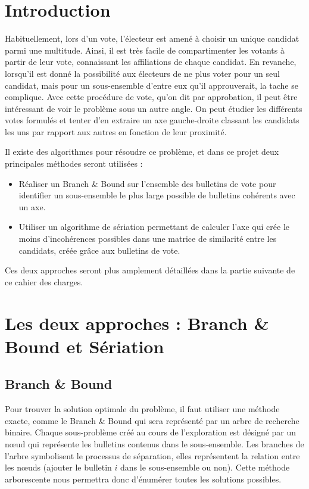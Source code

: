 \documentclass[12pt]{article}
\begin{document}
\section*{Introduction}
Habituellement, lors d'un vote, l'\'{e}lecteur est amen\'{e} \`{a} choisir un unique candidat parmi une multitude. Ainsi, il est tr\`{e}s facile de compartimenter les votants \`{a} partir de leur vote, connaissant les affiliations de chaque candidat. En revanche, lorsqu'il est donn\'{e} la possibilit\'{e} aux \'{e}lecteurs de ne plus voter pour un seul candidat, mais pour un sous-ensemble d'entre eux qu'il approuverait, la tache se complique. Avec cette proc\'{e}dure de vote, qu'on dit par approbation, il peut \^{e}tre int\'{e}ressant de voir le probl\`{e}me sous un autre angle. On peut \'{e}tudier les diff\'{e}rents votes formul\'{e}s et tenter d'en extraire un axe \og gauche-droite \fg{} classant les candidats les uns par rapport aux autres en fonction de leur proximit\'{e}.

Il existe des algorithmes pour r\'{e}soudre ce probl\`{e}me, et dans ce projet deux principales m\'{e}thodes seront utilis\'{e}es :
\begin{itemize}
	\item R\'{e}aliser un \og Branch \& Bound \fg{} sur l'ensemble des bulletins de vote pour identifier un sous-ensemble le plus large possible de bulletins coh\'{e}rents avec un axe.
	\item Utiliser un algorithme de s\'{e}riation permettant de calculer l'axe qui cr\'{e}e le moins d'incoh\'{e}rences possibles dans une matrice de similarit\'{e} entre les candidats, cr\'{e}\'{e}e gr\^{a}ce aux bulletins de vote.
\end{itemize}

Ces deux approches seront plus amplement d\'{e}taill\'{e}es dans la partie suivante de ce cahier des charges.

\section*{Les deux approches : Branch \& Bound et S\'{e}riation}


\subsection*{Branch \& Bound}

Pour trouver la solution optimale du probl\`{e}me, il faut utiliser une m\'{e}thode exacte, comme le \og Branch \& Bound \fg{} qui sera repr\'{e}sent\'{e} par un arbre de recherche binaire. Chaque sous-probl\`{e}me cr\'{e}\'{e} au cours de l'exploration est d\'{e}sign\'{e} par un n\oe{}ud qui repr\'{e}sente les bulletins contenus dans le sous-ensemble. Les branches de l'arbre symbolisent le processus de s\'{e}paration, elles repr\'{e}sentent la relation entre les n\oe{}uds (ajouter le bulletin $i$ dans le sous-ensemble ou non). Cette m\'{e}thode arborescente nous permettra donc d'\'{e}num\'{e}rer toutes les solutions possibles.
\end{document}
